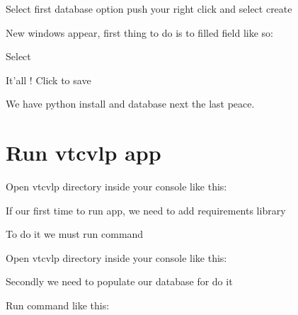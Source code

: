 \documentclass[letterpaper,10pt,english]{sphinxmanual}
\let\sphinxpxdimen\pdfpxdimen\else\newdimen\sphinxpxdimen
\begin{document}
Select first database option push your right click and select create

New windows appear, first thing to do is to filled field like so:

 

 Select 

\noindent\sphinxincludegraphics[width=670\sphinxpxdimen,height=520\sphinxpxdimen]{{capture4}.png}

It’all !  Click to save

We have python install and database next the last peace.


\section{Run vtcvlp app}
\label{\detokenize{usage:run-vtcvlp-app}}
Open vtcvlp directory inside your console like this:

\begin{sphinxVerbatim}[commandchars=\\\{\}]
\PYGZbs{}\PYGZbs{}\PYGZbs{}  
\end{sphinxVerbatim}

If our first time to run app, we need to add requirements library

To do it we must run command

Open vtcvlp directory inside your console like this:

\begin{sphinxVerbatim}[commandchars=\\\{\}]
\PYGZbs{}\PYGZbs{}\PYGZbs{}    
\end{sphinxVerbatim}

Secondly we need to populate our database for do it

Run command  like this:

\begin{sphinxVerbatim}[commandchars=\\\{\}]
\PYGZbs{}\PYGZbs{}\PYGZbs{}\PYGZbs{}   
\end{sphinxVerbatim}
\end{document}
